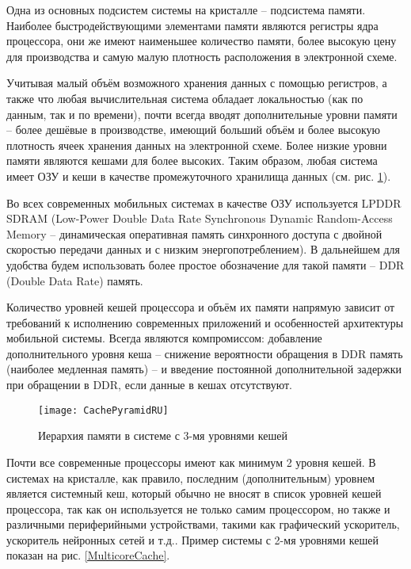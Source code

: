     Одна из основных подсистем системы на кристалле -- подсистема памяти. Наиболее быстродействующими
    элементами памяти являются регистры ядра процессора, они же имеют наименьшее количество памяти,
    более высокую цену для производства и самую малую плотность расположения в электронной схеме.

    Учитывая малый объём возможного хранения данных с помощью регистров, а также
    что любая вычислительная система обладает локальностью (как по данным, так и по
    времени), почти всегда вводят дополнительные уровни памяти -- более дешёвые в производстве,
    имеющий больший объём и более высокую плотность ячеек хранения данных на электронной схеме.
    Более низкие уровни памяти являются кешами для более высоких.
    Таким образом, любая система имеет ОЗУ и кеши в качестве промежуточного хранилища данных
    (см. рис. \ref{CachePyramid}).

    Во всех современных мобильных системах в качестве ОЗУ используется LPDDR SDRAM
    (Low-Power Double Data Rate Synchronous Dynamic Random-Access Memory --
    динамическая оперативная память синхронного доступа с двойной скоростью передачи данных и
    с низким энергопотреблением). В дальнейшем для удобства будем использовать более простое
    обозначение для такой памяти -- DDR (Double Data Rate) память.

    Количество уровней кешей процессора и объём их памяти напрямую зависит от требований к исполнению
    современных приложений и особенностей архитектуры мобильной системы.
    Всегда являются компромиссом: добавление дополнительного
    уровня кеша -- снижение вероятности обращения в DDR память (наиболее медленная память) --
    и введение постоянной дополнительной задержки при обращении в DDR, если данные
    в кешах отсутствуют.

    \begin{figure}[!h]
        \caption{Иерархия памяти в системе с 3-мя уровнями кешей}
        \centering
        \texttt{[image: CachePyramidRU]}
        \label{CachePyramid}
    \end{figure}

    Почти все современные процессоры имеют как минимум 2 уровня кешей. В системах на кристалле,
    как правило, последним (дополнительным) уровнем является системный кеш, который обычно
    не вносят в список уровней кешей процессора, так как он используется не только самим процессором,
    но также и различными периферийными устройствами, такими как графический ускоритель, ускоритель
    нейронных сетей и т.д.. Пример системы с 2-мя уровнями кешей показан на рис. \ref{MulticoreCache}.

